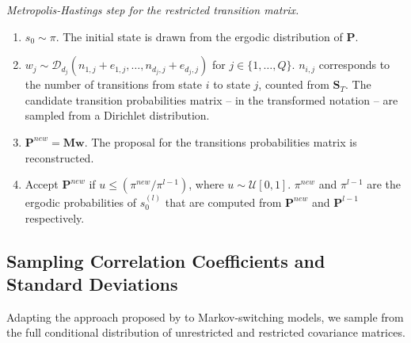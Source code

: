 \documentclass[final,3p,authoryear]{elsarticle}
\begin{document}
\begin{al}\label{al:MH-P} \textit{Metropolis-Hastings step for the restricted transition matrix.}
	\begin{enumerate}
		\item $s_0 \sim \pi$. The initial state is drawn from the ergodic distribution of $\mathbf{P}$.
		\item $w_j \sim \mathcal{D}_{d_j} (n_{1,j} + e_{1,j},\dots, n_{d_j,j} + e_{d_j,j} )$ for $j\in\{1,\dots, Q\}$. $n_{i,j}$ corresponds to the number of transitions from state $i$ to state $j$, counted from $\mathbf{S}_T$. The candidate transition probabilities matrix -- in the transformed notation -- are sampled from a Dirichlet distribution.
		\item $\mathbf{P}^{new} = \mathbf{M} \mathbf{w}$. The proposal for the transitions probabilities matrix is reconstructed.
        \item Accept $\mathbf{P}^{new}$ if $u \le (\pi^{new}/\pi^{l-1})$, where $u \sim \mathcal{U}[0,1]$. $\pi^{new}$ and $\pi^{l-1}$ are the ergodic probabilities of $s_0^{(l)}$ that are computed from $\mathbf{P}^{new}$ and $\mathbf{P}^{l-1}$ respectively.
	\end{enumerate}
\end{al} 



\subsection{Sampling Correlation Coefficients and Standard Deviations}


\noindent
Adapting the approach proposed by \cite{Barnard2000} to Markov-switching models, we sample from the full conditional distribution of unrestricted and restricted covariance matrices. 
\end{document}
